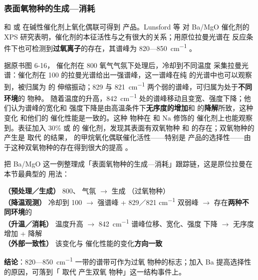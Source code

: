 \subsubsection{表面氧物种的生成—消耗}

 和  或  在碱性催化剂上氧化偶联可得到  产品。Lunsford 等
对 Ba/MgO 催化剂的 XPS 研究表明，催化剂的本征活性与之有很大的关系；用原位拉曼光谱在
反应条件下也可检测到\textbf{过氧离子}的存在，其谱峰为 820—\qty{850}{cm^{-1}}
。

据原书图 6-16， 催化剂在 \qty{800}{\degC} 氧气气氛下处理后，冷却到不同温度
采集拉曼光谱：催化剂在 \qty{100}{\degC} 的拉曼光谱给出一强谱峰，这一谱峰在纯 
的光谱中也可以观察到，被归属为  的  伸缩振动；829 与
\qty{821}{cm^{-1}} 两个弱的谱峰，可归属为处于\textbf{不同环境}的  物种。
随着温度的升高，\qty{842}{cm^{-1}} 处的谱峰移动且变宽、强度下降；他们认为谱峰的宽化和
强度下降是由高温条件下\textbf{无序度的增加}和  的\textbf{降解}所致，这种变化
和他们的  催化性能是一致的。这种  物种在  和 Na 修饰的
 催化剂上也能观察到。表征加入 30\%  或  的 
催化剂，发现其表面有双氧物种  和  的存在；双氧物种的产生是
 取代  的结果， 的甲烷氧化偶联催化活性——特别是
 产品的选择性——由于这种双氧物种的存在得到很大的提高
。

\begin{dataflow}
把 Ba/MgO 这一例整理成「表面氧物种的生成—消耗」跟踪链，这是原位拉曼在本节最典型的
用法：

\textbf{（预处理／生成）} \qty{800}{\degC}、 气氛 $\rightarrow$ 生成
（过氧物种）\\
\textbf{（降温观测）} 冷却到 \qty{100}{\degC} $\rightarrow$ 强谱峰 + 829／821
\unit{cm^{-1}} 双弱峰 $\rightarrow$ 存在\textbf{两种不同环境}的 \\
\textbf{（升温／消耗）} 温度升高 $\rightarrow$ \qty{842}{cm^{-1}} 谱峰位移、宽化、强度
下降 $\rightarrow$ 无序度增加 +  降解\\
\textbf{（外部一致性）} 该变化与  催化性能的变化\textbf{方向一致}

\textbf{结论}：820—\qty{850}{cm^{-1}} 一带的谱带可作为过氧
物种的标志；加入 Ba 提高选择性的原因，可落到「 取代  产生双氧
物种」这一结构事件上。
\end{dataflow}

